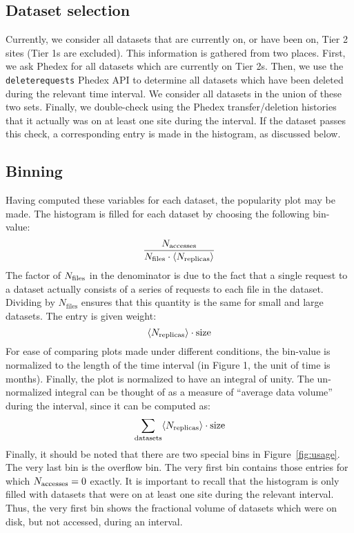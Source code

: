 \subsection{Dataset selection}
Currently, we consider all datasets that are currently on, or have been on, Tier 2 sites (Tier 1s are excluded). This information is gathered from two places. First, we ask Phedex for all datasets which are currently on Tier 2s. Then, we use the \verb|deleterequests| Phedex API to determine all datasets which have been deleted during the relevant time interval. We consider all datasets in the union of these two sets. Finally, we double-check using the Phedex transfer/deletion histories that it actually was on at least one site during the interval. If the dataset passes this check, a corresponding entry is made in the histogram, as discussed below.

\subsection{Binning}

Having computed these variables for each dataset, the popularity plot may be made. The histogram is filled for each dataset by choosing the following bin-value:
\begin{equation}\dfrac{N_\text{accesses}}{N_\text{files}\cdot \langle N_\text{replicas}\rangle}\end{equation}
The factor of $N_\text{files}$ in the denominator is due to the fact that a single request to a dataset actually consists of a series of requests to each file in the dataset. Dividing by $N_\text{files}$ ensures that this quantity is the same for small and large datasets. The entry is given weight:
\begin{equation}
\langle N_\text{replicas}\rangle\cdot \text{size}
\end{equation}
For ease of comparing plots made under different conditions, the bin-value is normalized to the length of the time interval (in Figure 1, the unit of time is months). Finally, the plot is normalized to have an integral of unity. The un-normalized integral can be thought of as a measure of ``average data volume'' during the interval, since it can be computed as:
\begin{equation}
\sum_\text{datasets} \langle N_\text{replicas}\rangle \cdot \text{size}
\end{equation}
Finally, it should be noted that there are two special bins in Figure~\ref{fig:usage}. The very last bin is the overflow bin. The very first bin contains those entries for which $N_\text{accesses}=0$ exactly. It is important to recall that the histogram is only filled with datasets that were on at least one site during the relevant interval. Thus, the very first bin shows the fractional volume of datasets which were on disk, but not accessed, during an interval.